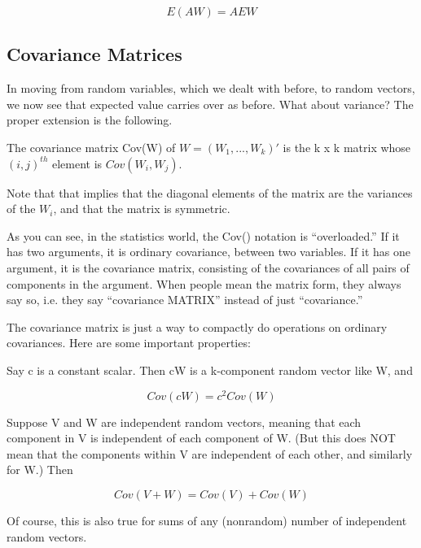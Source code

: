 \begin{equation}
\label{eaw}
E(AW) = A EW
\end{equation}

\subsection{Covariance Matrices}

In moving from random variables, which we dealt with before, to random
vectors, we now see that expected value carries over as before.  What
about variance?  The proper extension is the following.

\begin{definition}
The covariance matrix Cov(W) of $W = (W_1,...,W_k)'$
is the k x k matrix whose $(i,j)^{th}$ element is $Cov(W_i,W_j)$.  
\end{definition}

Note that that implies that the diagonal elements of the matrix are the
variances of the $W_i$, and that the matrix is symmetric.  

As you can see, in the statistics world, the Cov() notation is
``overloaded.''  If it has two arguments, it is ordinary covariance,
between two variables.  If it has one argument, it is the covariance
matrix, consisting of the covariances of all pairs of components in the
argument.  When people mean the matrix form, they always say so, i.e.
they say ``covariance MATRIX'' instead of just ``covariance.''

The covariance matrix is just a way to compactly do operations on
ordinary covariances.  Here are some important properties:

Say c is a constant scalar.  Then cW is a
k-component random vector like W, and 

\begin{equation}
\label{c2cov}
Cov(cW) = c^2 Cov(W)
\end{equation}

Suppose V and W are independent random vectors, meaning that each
component in V is independent of each component of W.  (But this does
NOT mean that the components within V are independent of each other, and
similarly for W.)  Then

\begin{equation}
\label{vectorsumcov}
Cov(V + W) = Cov(V) + Cov(W) 
\end{equation}

Of course, this is also true for sums of any (nonrandom) number of
independent random vectors.

